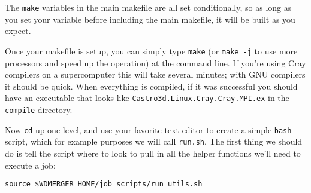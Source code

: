 \documentclass[12pt]{book}
\begin{document}
The \texttt{make} variables in the main makefile are all set conditionally, so as long 
as you set your variable before including the main makefile, it will be built as you expect.

Once your makefile is setup, you can simply type \texttt{make} (or \texttt{make -j} 
to use more processors and speed up the operation) at the command line. 
If you're using Cray compilers on a supercomputer this will take several minutes;
with GNU compilers it should be quick. When everything is compiled, if it was
successful you should have an executable that looks like \texttt{Castro3d.Linux.Cray.Cray.MPI.ex}
in the \texttt{compile} directory.

Now \texttt{cd} up one level, and use your favorite text editor to create a simple 
\texttt{bash} script, which for example purposes we will call \texttt{run.sh}.
The first thing we should do is tell the script where to look to pull in 
all the helper functions we'll need to execute a job:

\begin{lstlisting}
source $WDMERGER_HOME/job_scripts/run_utils.sh
\end{lstlisting}%
\end{document}
